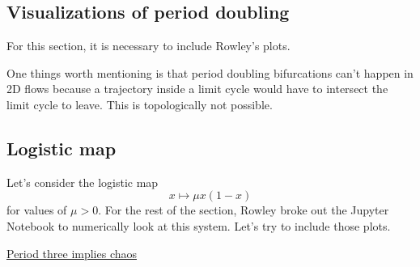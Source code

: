 \documentclass{article}
\begin{document}
\subsection{Visualizations of period doubling}

For this section, it is necessary to include Rowley's plots.

One things worth mentioning is that period doubling bifurcations can't happen in 2D flows because a trajectory inside a limit cycle would have to intersect the limit cycle to leave. This is topologically not possible.

\subsection{Logistic map}

Let's consider the logistic map 
\[
x\mapsto \mu x \left(1 - x\right)
\]
for values of $\mu>0$. For the rest of the section, Rowley broke out the Jupyter Notebook to numerically look at this system. Let's try to include those plots.

\href{https://doi.org/10.1080/00029890.1975.11994008}{Period three implies chaos}
\end{document}
